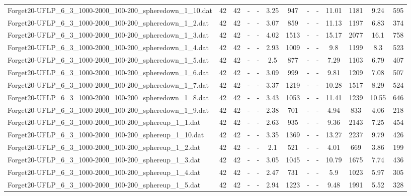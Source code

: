 \begin{table}[!ht]
{\begin{tabular}{lcccccccccccc}
Forget20-UFLP\_6\_3\_1000-2000\_100-200\_spheredown\_1\_10.dat & 42 & 42 &  - &  - & 3.25 & 947 &  - &  - & 11.01 & 1181 & 9.24 & 595 \\
Forget20-UFLP\_6\_3\_1000-2000\_100-200\_spheredown\_1\_2.dat & 42 & 42 &  - &  - & 3.07 & 859 &  - &  - & 11.13 & 1197 & 6.83 & 374 \\
Forget20-UFLP\_6\_3\_1000-2000\_100-200\_spheredown\_1\_3.dat & 42 & 42 &  - &  - & 4.02 & 1513 &  - &  - & 15.17 & 2077 & 16.1 & 758 \\
Forget20-UFLP\_6\_3\_1000-2000\_100-200\_spheredown\_1\_4.dat & 42 & 42 &  - &  - & 2.93 & 1009 &  - &  - & 9.8 & 1199 & 8.3 & 523 \\
Forget20-UFLP\_6\_3\_1000-2000\_100-200\_spheredown\_1\_5.dat & 42 & 42 &  - &  - & 2.5 & 877 &  - &  - & 7.29 & 1103 & 6.79 & 407 \\
Forget20-UFLP\_6\_3\_1000-2000\_100-200\_spheredown\_1\_6.dat & 42 & 42 &  - &  - & 3.09 & 999 &  - &  - & 9.81 & 1209 & 7.08 & 507 \\
Forget20-UFLP\_6\_3\_1000-2000\_100-200\_spheredown\_1\_7.dat & 42 & 42 &  - &  - & 3.37 & 1219 &  - &  - & 10.28 & 1517 & 8.29 & 524 \\
Forget20-UFLP\_6\_3\_1000-2000\_100-200\_spheredown\_1\_8.dat & 42 & 42 &  - &  - & 3.43 & 1053 &  - &  - & 11.41 & 1239 & 10.55 & 646 \\
Forget20-UFLP\_6\_3\_1000-2000\_100-200\_spheredown\_1\_9.dat & 42 & 42 &  - &  - & 2.38 & 701 &  - &  - & 4.94 & 833 & 4.06 & 218 \\
Forget20-UFLP\_6\_3\_1000-2000\_100-200\_sphereup\_1\_1.dat & 42 & 42 &  - &  - & 2.63 & 935 &  - &  - & 9.36 & 2143 & 7.25 & 454 \\
Forget20-UFLP\_6\_3\_1000-2000\_100-200\_sphereup\_1\_10.dat & 42 & 42 &  - &  - & 3.35 & 1369 &  - &  - & 13.27 & 2237 & 9.79 & 426 \\
Forget20-UFLP\_6\_3\_1000-2000\_100-200\_sphereup\_1\_2.dat & 42 & 42 &  - &  - & 2.1 & 521 &  - &  - & 4.01 & 669 & 3.86 & 199 \\
Forget20-UFLP\_6\_3\_1000-2000\_100-200\_sphereup\_1\_3.dat & 42 & 42 &  - &  - & 3.05 & 1045 &  - &  - & 10.79 & 1675 & 7.74 & 436 \\
Forget20-UFLP\_6\_3\_1000-2000\_100-200\_sphereup\_1\_4.dat & 42 & 42 &  - &  - & 2.47 & 731 &  - &  - & 5.9 & 1023 & 5.97 & 305 \\
Forget20-UFLP\_6\_3\_1000-2000\_100-200\_sphereup\_1\_5.dat & 42 & 42 &  - &  - & 2.94 & 1223 &  - &  - & 9.48 & 1991 & 5.52 & 328 \\

\end{tabular}}
\end{table}
